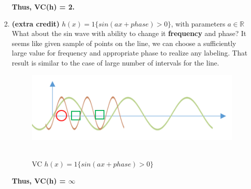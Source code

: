 \documentclass{article}
\begin{document}
\begin{enumerate}
\textbf{Thus, VC(h) = 2.}

\item \textbf{(extra credit)} $h(x)=1\{sin(ax + phase) >0 \}$, with parameters $a \in \mathbb{R}$\\
What about the sin wave with ability to change it \textbf{frequency} and phase? It seems like given sample of points on the line, we can choose a sufficiently large value for frequency and appropriate phase to realize any labeling. That result is similar to the case of large number of intervals for the line. 
\begin{figure}[!htb]
	\centering
	\includegraphics[width=4.5in,clip,keepaspectratio]{vc_5.png}\
	\caption{VC $h(x)=1\{sin(ax + phase) >0 \}$}	
\end{figure}

\textbf{Thus, VC(h) = $\infty$}



\end{enumerate}


 
\end{document}
